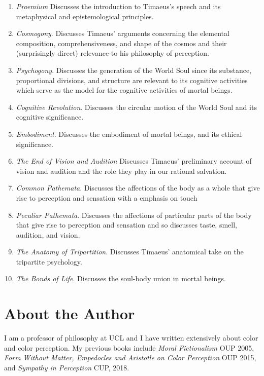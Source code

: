 \documentclass[12pt]{article}
\begin{document}
\begin{enumerate}
	\item \emph{Proemium} Discusses the introduction to Timaeus's speech and its metaphysical and epistemological principles.
	\item \emph{Cosmogony}. Discusses Timaeus' arguments concerning the elemental composition, comprehensiveness, and shape of the cosmos and their (surprisingly direct) relevance to his philosophy of perception.
	\item \emph{Psychogony}. Discusses the generation of the World Soul since its substance, proportional divisions, and structure are relevant to its cognitive activities which serve as the model for the cognitive activities of mortal beings.
	\item \emph{Cognitive Revolution}. Discusses the circular motion of the World Soul and its cognitive significance.
	\item \emph{Embodiment}. Discusses the embodiment of mortal beings, and its ethical significance.
	\item \emph{The End of Vision and Audition} Discusses Timaeus' preliminary account of vision and audition and the role they play in our rational salvation.
	\item \emph{Common Pathemata}. Discusses the affections of the body as a whole that give rise to perception and sensation with a emphasis on touch
	\item \emph{Peculiar Pathemata}. Discusses the affections of particular parts of the body that give rise to perception and sensation and so discusses taste, smell, audition, and vision.
	\item \emph{The Anatomy of Tripartition}. Discusses Timaeus' anatomical take on the tripartite psychology.
	\item \emph{The Bonds of Life}. Discusses the soul-body union in mortal beings.
\end{enumerate}


\section{About the Author} %
\label{sec:about_the_author}

I am a professor of philosophy at UCL and I have written extensively about color and color perception. My previous books include \emph{Moral Fictionalism} OUP 2005, \emph{Form Without Matter, Empedocles and Aristotle on Color Perception} OUP 2015, and \emph{Sympathy in Perception} CUP, 2018.

\end{document}
